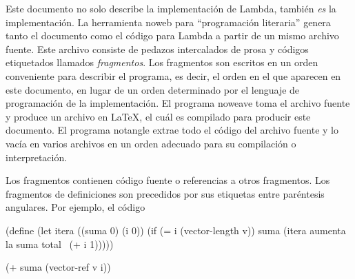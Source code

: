 \documentclass[letterpaper, twoside, openright, 11pt]{book}%
\begin{document}
Este documento no solo describe la implementación de {\Tt{}Lambda\nwendquote}, también \emph{es} la implementación. La herramienta {\Tt{}noweb\nwendquote} para ``programación literaria'' genera tanto el documento como el código para {\Tt{}Lambda\nwendquote} a partir de un mismo archivo fuente. Este archivo consiste de pedazos intercalados de prosa y códigos etiquetados llamados \emph{fragmentos}. Los fragmentos son escritos en un orden conveniente para describir el programa, es decir, el orden en el que aparecen en este documento, en lugar de un orden determinado por el lenguaje de programación de la implementación. El programa {\Tt{}noweave\nwendquote} toma el archivo fuente y produce un archivo en \LaTeX{}, el cuál es compilado para producir este documento. El programa {\Tt{}notangle\nwendquote} extrae todo el código del archivo fuente y lo vacía en varios archivos en un orden adecuado para su compilación o interpretación.

Los fragmentos contienen código fuente o referencias a otros fragmentos. Los fragmentos de definiciones son precedidos por sus etiquetas entre paréntesis angulares. Por ejemplo, el código

\nwenddocs{}\endmoddef\nwstartdeflinemarkup{}\nwenddeflinemarkup
(define 
  (let itera ((suma 0)
              (i    0))
    (if (= i (vector-length v))
        suma
        (itera \LA{}aumenta la \code{}suma\edoc{} total~{\nwtagstyle{}}\RA{} (+ i 1)))))

\eatline
{}\nwendcode{}\nwdocspar
\nwenddocs{}\endmoddef\nwstartdeflinemarkup{}\nwenddeflinemarkup
(+ suma (vector-ref v i))
\nwendcode{}\nwdocspar
\end{document}
